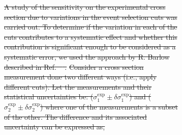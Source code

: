 \documentclass[aps, prl]{revtex4-2}  %
\providecommand{\DIFdeltex}[1]{{\protect\color{red}\sout{#1}}}                      %
\providecommand{\DIFdelbegin}{} %
\providecommand{\DIFdel}[1]{\texorpdfstring{\DIFdeltex{#1}}{}} %
\newcommand{\DIFscaledelfig}{0.5}
\newlength{\DIFdelgraphicswidth} %
\newlength{\DIFdelgraphicsheight} %
\newcommand{\DIFdelincludegraphics}[2][]{%
\sbox{\DIFdelgraphicsbox}{\DIFOincludegraphics[#1]{#2}}%
\settoboxwidth{\DIFdelgraphicswidth}{\DIFdelgraphicsbox} %
\settoboxtotalheight{\DIFdelgraphicsheight}{\DIFdelgraphicsbox} %
\scalebox{\DIFscaledelfig}{%
\parbox[b]{\DIFdelgraphicswidth}{\usebox{\DIFdelgraphicsbox}\\[-\baselineskip] \rule{\DIFdelgraphicswidth}{0em}}\llap{\resizebox{\DIFdelgraphicswidth}{\DIFdelgraphicsheight}{%
\setlength{\unitlength}{\DIFdelgraphicswidth}%
\begin{picture}(1,1)%
\thicklines\linethickness{2pt} %
{\color[rgb]{1,0,0}\put(0,0){\framebox(1,1){}}}%
{\color[rgb]{1,0,0}\put(0,0){\line( 1,1){1}}}%
{\color[rgb]{1,0,0}\put(0,1){\line(1,-1){1}}}%
\end{picture}%
}\hspace*{3pt}}} %
} %
\DeclareRobustCommand{\DIFdelbegin}{\DIFOdelbegin \let\includegraphics\DIFdelincludegraphics} %
\begin{document}
\begin{figure}[!h]
\begin{figure}[!h]
\indent \DIFdelbegin \DIFdel{A study of the sensitivity on the experimental cross section due to variations in the event selection cuts was carried out. 
To determine if the variation in each of the cuts contributes to a systematic effect and whether this contribution is significant
enough to be considered as a systematic error, we used the approach by R. Barlow described in Ref. \mbox{%
\cite{barlow2002systematic}}\hspace{0pt}%
.}%
\DIFdel{Consider a cross section measurement done two different ways (i.e., apply different cuts). Let the measurements and their
statistical uncertainties be: ($\sigma^{\mathrm{exp}}_{\mathrm{1}}\pm\delta\sigma^{\mathrm{exp}}_{\mathrm{1}}$) and ($\sigma^{\mathrm{exp}}_{\mathrm{2}}\pm\delta\sigma^{\mathrm{exp}}_{\mathrm{2}}$)
where one of the measurements is a subset of the other. The difference and its associated uncertainty can be expressed as,
}
\end{figure}
\end{figure}
\end{document}
